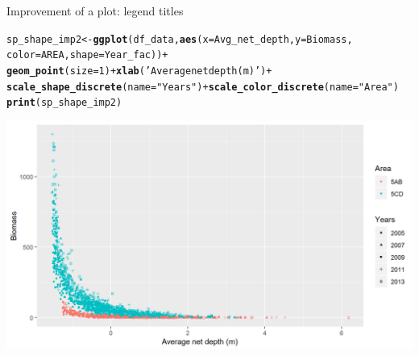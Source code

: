 \documentclass{beamer}\usepackage[]{graphicx}\usepackage[]{color}
\makeatletter
\newcommand{\hlnum}[1]{\textcolor[rgb]{0.686,0.059,0.569}{#1}}%
\newcommand{\hlstr}[1]{\textcolor[rgb]{0.192,0.494,0.8}{#1}}%
\newcommand{\hlopt}[1]{\textcolor[rgb]{0,0,0}{#1}}%
\newcommand{\hlstd}[1]{\textcolor[rgb]{0.345,0.345,0.345}{#1}}%
\newcommand{\hlkwb}[1]{\textcolor[rgb]{0.69,0.353,0.396}{#1}}%
\newcommand{\hlkwc}[1]{\textcolor[rgb]{0.333,0.667,0.333}{#1}}%
\newcommand{\hlkwd}[1]{\textcolor[rgb]{0.737,0.353,0.396}{\textbf{#1}}}%
\newenvironment{kframe}{%
 \def\at@end@of@kframe{}%
 \ifinner\ifhmode%
  \def\at@end@of@kframe{\end{minipage}}%
  \begin{minipage}{\columnwidth}%
 \fi\fi%
 \def\FrameCommand##1{\hskip\@totalleftmargin \hskip-\fboxsep
 \colorbox{shadecolor}{##1}\hskip-\fboxsep
     \hskip-\linewidth \hskip-\@totalleftmargin \hskip\columnwidth}%
 \MakeFramed {\advance\hsize-\width
   \@totalleftmargin\z@ \linewidth\hsize
   \@setminipage}}%
 {\par\unskip\endMakeFramed%
 \at@end@of@kframe}
\newenvironment{knitrout}{}{} %
\makeatother
\begin{document}
\begin{frame}[fragile]{Improvement of a plot: legend titles}
\begin{knitrout}\footnotesize
{}\color{fgcolor}\begin{kframe}
\begin{alltt}
\hlstd{sp_shape_imp2} \hlkwb{<-} \hlkwd{ggplot}\hlstd{(df_data,} \hlkwd{aes}\hlstd{(}\hlkwc{x}\hlstd{=Avg_net_depth,} \hlkwc{y}\hlstd{=Biomass,}
                                     \hlkwc{color}\hlstd{=AREA,} \hlkwc{shape}\hlstd{=Year_fac))} \hlopt{+}
  \hlkwd{geom_point}\hlstd{(}\hlkwc{size}\hlstd{=}\hlnum{1}\hlstd{)} \hlopt{+} \hlkwd{xlab}\hlstd{(}\hlstr{'Average net depth (m)'}\hlstd{)} \hlopt{+}
  \hlkwd{scale_shape_discrete}\hlstd{(}\hlkwc{name}\hlstd{=}\hlstr{"Years"}\hlstd{)} \hlopt{+} \hlkwd{scale_color_discrete}\hlstd{(}\hlkwc{name}\hlstd{=}\hlstr{"Area"}\hlstd{)}
\hlkwd{print}\hlstd{(sp_shape_imp2)}
\end{alltt}
\end{kframe}

{\centering \includegraphics[width=.9\linewidth]{figure/sp_shape_imp2-1} 

}



\end{knitrout}
\end{frame}
\end{document}
